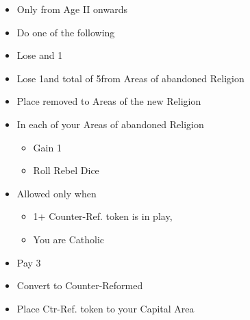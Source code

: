 \documentclass[10pt]{article}
\begin{document}
\begin{itemize}
	\item Only from Age II onwards
	\item Do one of the following
\end{itemize}
\begin{itemize}
	\item Lose  and 1\stability
	\item Lose 1\marriage and total of 5\influence from Areas of abandoned Religion
	\item Place removed \influence to Areas of the new Religion
	\item In each of your Areas of abandoned Religion
	\begin{itemize}
		\item Gain 1\unrest
		\item Roll Rebel Dice
	\end{itemize}
\end{itemize}
\begin{itemize}
	\item Allowed only when
	\begin{itemize}
		\item 1+ Counter-Ref. token is in play, 
		\item You are Catholic
	\end{itemize}
	\item Pay 3\adminpower
	\item Convert to Counter-Reformed
	\item Place Ctr-Ref. token to your Capital Area
\end{itemize}
\end{document}
